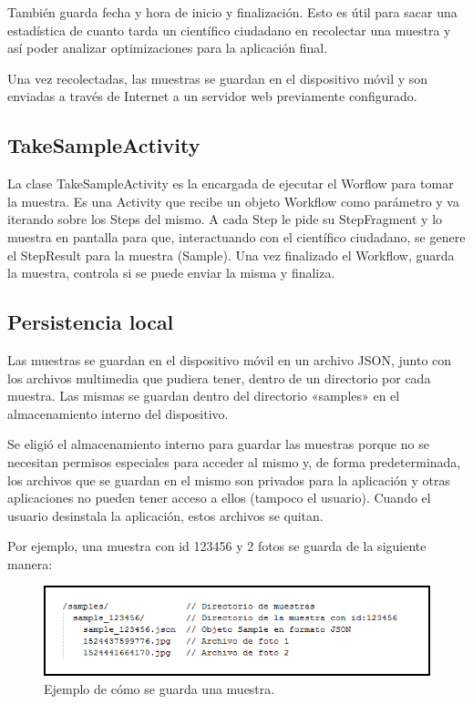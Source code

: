También guarda fecha y hora de inicio y finalización. Esto es útil para sacar una estadística de cuanto tarda un científico ciudadano en recolectar una muestra y así poder analizar optimizaciones para la aplicación final.

Una vez recolectadas, las muestras se guardan en el dispositivo móvil y son enviadas a través de Internet a un servidor web previamente configurado.

\subsection{TakeSampleActivity}
La clase TakeSampleActivity es la encargada de ejecutar el Worflow para tomar la muestra. Es una Activity que recibe un objeto Workflow como parámetro y va iterando sobre los Steps del mismo. A cada Step le pide su StepFragment y lo muestra en pantalla para que, interactuando con el científico ciudadano, se genere el StepResult para la muestra (Sample). Una vez finalizado el Workflow, guarda la muestra, controla si se puede enviar la misma y finaliza.



\subsection{Persistencia local}\label{sec:persistencia_local}
Las muestras se guardan en el dispositivo móvil en un archivo JSON, junto con los archivos multimedia que pudiera tener, dentro de un directorio por cada muestra. Las mismas se guardan dentro del directorio «samples» en el almacenamiento interno del dispositivo.

Se eligió el almacenamiento interno para guardar las muestras porque no se necesitan permisos especiales para acceder al mismo y, de forma predeterminada, los archivos que se guardan en el mismo son privados para la aplicación y otras aplicaciones no pueden tener acceso a ellos (tampoco el usuario). Cuando el usuario desinstala la aplicación, estos archivos se quitan\cite{androidInternalStorage}.

\clearpage
Por ejemplo, una muestra con id 123456 y 2 fotos se guarda de la siguiente manera:

\begin{figure}[H]
  \centering
    \includegraphics[scale=0.8]{05-implementacion/persistencia_local.png} 
   \caption{Ejemplo de cómo se guarda una muestra.}
\end{figure}		

